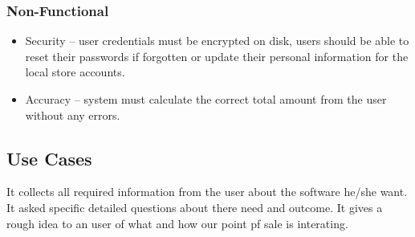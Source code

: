 \documentclass[10pt,conference,onecolumn,compsoc]{IEEEtran}
\begin{document}
\subsubsection{Non-Functional}
\begin{itemize}
\item Security -- user credentials must be encrypted on disk, users should be able to reset their passwords if forgotten or update their personal information for the local store accounts.
\item Accuracy -- system must calculate the correct total amount from the user without any errors. 
\end{itemize}

\subsection{Use Cases}
It collects all required information from the user about the software he/she want. It asked specific detailed questions about there need and outcome. It gives a rough idea to an user of what and how our point pf sale is interating.

\begin{table}[!htb]
\centering
{}\\
\caption{Point of Sale Use Case Table}
\label{tab:useCaseIndex}
\end{table}
\end{document}
